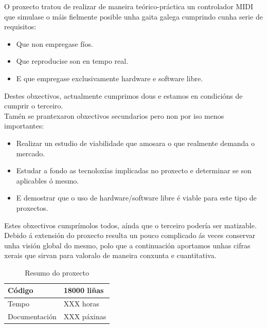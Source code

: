  O proxecto tratou de realizar de maneira teórico-práctica un controlador MIDI
 que simulase o máis fielmente posible unha gaita galega cumprindo cunha serie
 de requisitos:
 
 \begin{itemize}
  \item Que non empregase fíos.
  \item Que reproducise son en tempo real.
  \item E que empregase exclusivamente hardware e software libre.
 \end{itemize}
 
 
 Destes obxectivos, actualmente cumprimos dous e estamos en condicións de
 cumprir o terceiro. \\
 
 Tamén se prantexaron obxectivos secundarios pero non por iso menos importantes:
 
 \begin{itemize}
  \item Realizar un estudio de viabilidade que amosara o que realmente demanda o
    mercado.
  \item Estudar a fondo as tecnoloxías implicadas no proxecto e determinar se
    son aplicables ó mesmo.
  \item E demostrar que o uso de hardware/software libre é viable para este tipo
    de proxectos.
 \end{itemize}
 
 
 Estes obxectivos cumprímolos todos, aínda que o terceiro podería ser
 matizable. \\
 
 Debido á extensión do proxecto resulta un pouco complicado ás veces conservar
 unha visión global do mesmo, polo que a continuación aportamos unhas cifras
 xerais que sirvan para valoralo de maneira conxunta e cuantitativa. \\
 
 \begin{table}[htbp]
  \centering
  \begin{tabular}{|l|l|}
   \hline
   Código & 18000 liñas \\
   \hline
   Tempo & XXX horas \\ %
   \hline
   Documentación & XXX páxinas \\ %
   \hline
  \end{tabular}
  \caption{Resumo do proxecto}
  \label{tabla:ResumoProxecto}
 \end{table}
 
